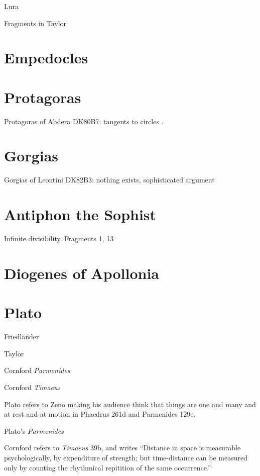 \documentclass{amsart}
\theoremstyle{definition}
\begin{document}
Lura \cite{luria}

Fragments in Taylor \cite{taylor2010}


\section{Empedocles}



\section{Protagoras}
Protagoras of Abdera DK80B7: tangents to circles \cite[p.~126]{ancilla}.


\section{Gorgias}
Gorgias of Leontini DK82B3: nothing exists, sophisticated argument \cite[p.~128]{ancilla}


\section{Antiphon the Sophist}
Infinite divisibility. Fragments 1, 13 \cite{antiphon}


\section{Diogenes of Apollonia}




\section{Plato}
Friedl\"ander \cite{friedlander}

Taylor \cite{taylor}

Cornford {\em Parmenides} \cite{parmenides}

Cornford {\em Timaeus} \cite{timaeus}

Plato refers to Zeno making his audience think that things are one and many and at rest and at motion in Phaedrus 261d and Parmenides 129e.

Plato's {\em Parmenides} \cite[pp.~93--98, 250--260]{allen}

Cornford \cite[p.~160]{religion} refers to {\em Timaeus} 39b, and writes ``Distance in space is measurable psychologically, by expenditure of strength; but time-distance
can be measured only by counting the rhythmical repitition of the same occurrence.''
\end{document}
